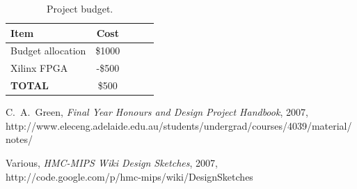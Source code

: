 \documentclass[a4paper,12pt]{article}
\begin{document}
\begin{table}[h]
\begin{tabular}{|l|c|c|c|c|}
  \hline
  \textbf{Item} & \textbf{Cost} \\
  \hline
  \hline
  Budget allocation & \$1000 \\
  \hline
  Xilinx FPGA & -\$500 \\
  \hline
  \hline
  \textbf{TOTAL} & \$500 \\
  \hline
\end{tabular}
\caption{Project budget. }
 \label{budget}
\end{table}

\begin{thebibliography}{99}

 C.~A.~Green, \emph{Final Year Honours and Design
  Project Handbook}, 2007, http://www.eleceng.adelaide.edu.au/students/undergrad/courses/4039/material/notes/

 Various, \emph{HMC-MIPS Wiki Design Sketches},
2007, http://code.google.com/p/hmc-mips/wiki/DesignSketches

\end{thebibliography}

%
%
\end{document}
